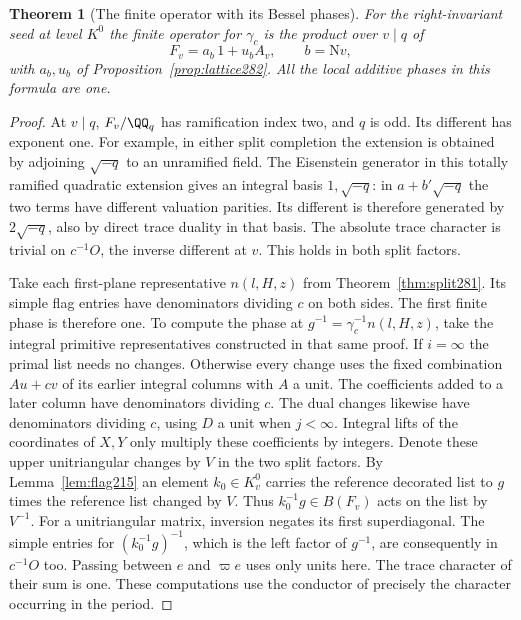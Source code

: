 \documentclass[a4paper,11pt]{article}
\newtheorem{theorem}[proposition]{Theorem}
\theoremstyle{definition}
\theoremstyle{remark}
\numberwithin{equation}{section}
\begin{document}
\begin{theorem}[The finite operator with its Bessel phases]\leavevmode
\label{thm:phase282}
For the right-invariant seed at level \(K^0\) the finite
operator for \(\gamma_c\) is the product over \(v\mid q\)
of
\[
                     F_v=a_b\,1+u_b A_v,\qquad b=\mathrm Nv ,
\]
with \(a_b,u_b\) of Proposition~\ref{prop:lattice282}.
All the local additive phases in this formula are one.
\end{theorem}
\begin{proof}
At \(v\mid q\), \(F_v/\QQ_q\) has ramification index two,
and \(q\) is odd. Its different has exponent one. For example,
in either split completion the extension is obtained by
adjoining \(\sqrt{-q}\) to an unramified field. The Eisenstein
generator in this totally ramified quadratic extension gives
an integral basis \(1,\sqrt{-q}\): in \(a+b'\sqrt{-q}\)
the two terms have different valuation parities. Its different
is therefore generated by \(2\sqrt{-q}\), also by direct
trace duality in that basis. The absolute trace character
is trivial on \(c^{-1}O\), the inverse different at \(v\).
This holds in both split factors.

Take each first-plane representative \(n(l,H,z)\) from
Theorem~\ref{thm:split281}. Its simple flag entries have
denominators dividing \(c\) on both sides. The first finite
phase is therefore one. To compute the phase at
\(g^{-1}=\gamma_c^{-1}n(l,H,z)\), take the integral primitive
representatives constructed in that same proof. If \(i=\infty\)
the primal list needs no changes. Otherwise every change uses
the fixed combination \(Au+cv\) of its earlier integral
columns with \(A\) a unit. The coefficients added to a
later column have denominators dividing \(c\). The dual
changes likewise have denominators dividing \(c\), using
\(D\) a unit when \(j<\infty\). Integral lifts of the
coordinates of \(X,Y\) only multiply these coefficients by
integers. Denote these upper unitriangular changes by \(V\)
in the two split factors. By Lemma~\ref{lem:flag215} an
element \(k_0\in K_v^0\) carries the reference decorated
list to \(g\) times the reference list changed by \(V\).
Thus \(k_0^{-1}g\in B(F_v)\) acts on the list by \(V^{-1}\).
For a unitriangular matrix, inversion negates its first
superdiagonal. The simple entries for \((k_0^{-1}g)^{-1}\),
which is the left factor of \(g^{-1}\), are consequently
in \(c^{-1}O\) too. Passing between \(e\) and \(\varpi e\)
uses only units here. The trace character of their sum is
one. These computations use the conductor of precisely the
character occurring in the period.


\end{proof}
\end{document}
